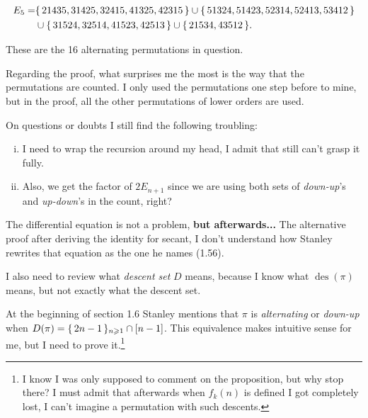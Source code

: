 \documentclass[12pt]{memoir}
\DeclareMathOperator{\des}{des}
\begin{document}
\begin{ptcbr}
\begin{align*}
   E_5=&\{\,21435,31425,32415,41325,42315\,\}\cup\{\,51324,51423,52314,52413,53412\,\}\\
   &\cup\{\,31524,32514,41523,42513\,\}\cup\{\,21534,43512\,\}.
\end{align*}

These are the 16 alternating permutations in question.\par 
Regarding the proof, what surprises me the most is the way that the permutations are counted. I only used the permutations one step before to mine, but in the proof, all the other permutations of lower orders are used.\par 
On questions or doubts I still find the following troubling:

\begin{enumerate}[i)]
   \itemsep=-0.4em
   \item I need to wrap the recursion around my head, I admit that still can't grasp it fully. 
   \item Also, we get the factor of $2E_{n+1}$ since we are using both sets of \emph{down-up}'s and \emph{up-down}'s in the count, right?
\end{enumerate}
The differential equation is not a problem, \textbf{but afterwards...} The alternative proof after deriving the identity for secant, I don't understand how Stanley rewrites that equation as the one he names (1.56).\par 
I also need to review what \emph{descent set} $D$ means, because I know what $\des(\pi)$ means, but not exactly what the descent set.\par 
At the beginning of section 1.6 Stanley mentions that $\pi$ is \emph{alternating} or \emph{down-up} when $D(\pi)=\{\,2n-1\,\}_{n\geqslant 1}\cap[n-1]$. This equivalence makes intuitive sense for me, but I need to prove it.\footnote{I know I was only supposed to comment on the proposition, but why stop there? I must admit that afterwards when $f_k(n)$ is defined I got completely lost, I can't imagine a permutation with such descents.}
\end{ptcbr}
\end{document}
